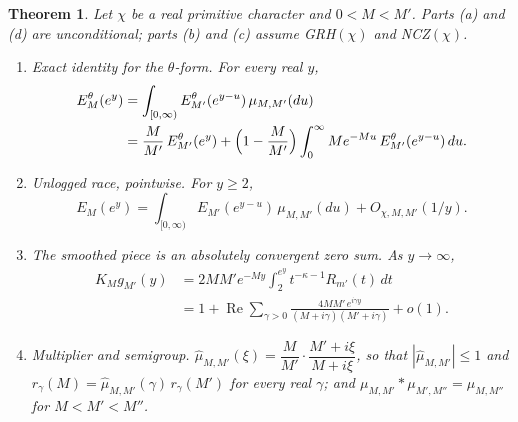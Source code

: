 \documentclass[11pt]{amsart}
\newtheorem{theorem}{Theorem}[section]
\theoremstyle{definition}
\numberwithin{equation}{section}
\newcommand{\re}{\operatorname{Re}}
\newcommand{\Ein}{E^{\theta}}
\begin{document}
\begin{theorem}\label{thm:resolvent}
Let $\chi$ be a real primitive character and $0<M<M'$. Parts (a) and
(d) are unconditional; parts (b) and (c) assume GRH$(\chi)$ and
NCZ$(\chi)$.
\begin{enumerate}
\item[(a)] \emph{Exact identity for the $\theta$-form.} For every
real $y$,
\begin{align*}
\Ein_M(e^y)&=\int_{[0,\infty)}\Ein_{M'}(e^{y-u})\,\mu_{M,M'}(du)\\
&=\frac{M}{M'}\,\Ein_{M'}(e^y)+\Bigl(1-\frac{M}{M'}\Bigr)
\int_0^\infty Me^{-Mu}\,\Ein_{M'}(e^{y-u})\,du .
\end{align*}
\item[(b)] \emph{Unlogged race, pointwise.} For $y\ge2$,
\[
E_M(e^y)=\int_{[0,\infty)}E_{M'}(e^{y-u})\,\mu_{M,M'}(du)
+O_{\chi,M,M'}(1/y).
\]
\item[(c)] \emph{The smoothed piece is an absolutely convergent zero
sum.} As $y\to\infty$,
\begin{align*}
K_Mg_{M'}(y)&=2MM'e^{-My}\int_2^{e^y}t^{-\kappa-1}R_{m'}(t)\,dt\\
&=1+\re\sum_{\gamma>0}\frac{4MM'\,e^{i\gamma y}}{(M+i\gamma)(M'+i\gamma)}
+o(1).
\end{align*}
\item[(d)] \emph{Multiplier and semigroup.}
$\hat\mu_{M,M'}(\xi)=\dfrac{M}{M'}\cdot\dfrac{M'+i\xi}{M+i\xi}$, so
that $|\hat\mu_{M,M'}|\le1$ and
$r_\gamma(M)=\hat\mu_{M,M'}(\gamma)\,r_\gamma(M')$ for every real
$\gamma$; and $\mu_{M,M'}*\mu_{M',M''}=\mu_{M,M''}$ for $M<M'<M''$.
\end{enumerate}
\end{theorem}
\end{document}
